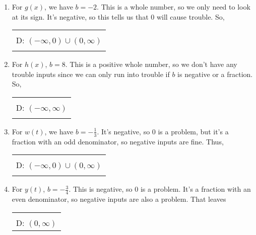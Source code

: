 {\begin{enumerate}
\begin{center}
\begin{tabular}{| c |}
			\\[-4pt]
			D: $(-\infty,\infty)$ \\[-4pt]
			\\\hline
		\end{tabular}
	\end{center}
		\item For $g(x)$, we have $b=-2$. This is a whole number, so we only need to look at its sign. It's negative, so this tells us that 0 will cause trouble. So, 	
			\begin{center}
		\begin{tabular}{| c |} \hline
			\\[-4pt]
			D: $(-\infty,0)\cup(0,\infty)$ \\[-4pt]
			\\\hline
		\end{tabular}
	\end{center}
		\item For $h(x)$, $b=8$. This is a positive whole number, so we don't have any trouble inputs since we can only run into trouble if $b$ is negative or a fraction. So, 
				\begin{center}
		\begin{tabular}{| c |} \hline
			\\[-4pt]
			D: $(-\infty,\infty)$ \\[-4pt]
			\\\hline
		\end{tabular}
	\end{center}
		\item For $w(t)$, we have $b=-\frac{1}{3}$. It's negative, so 0 is a problem, but it's a fraction with an odd denominator, so negative inputs are fine. Thus, 
				\begin{center}
		\begin{tabular}{| c |} \hline
			\\[-4pt]
			D: $(-\infty,0)\cup(0,\infty)$ \\[-4pt]
			\\\hline
		\end{tabular}
	\end{center}
		\item For $y(t)$, $b=-\frac{3}{4}$. This is negative, so 0 is a problem. It's a fraction with an even denominator, so negative inputs are also a problem. That leaves 
				\begin{center}
		\begin{tabular}{| c |} \hline
			\\[-4pt]
			D: $(0,\infty)$ \\[-4pt]

\end{tabular}
\end{center}
\end{enumerate}}
